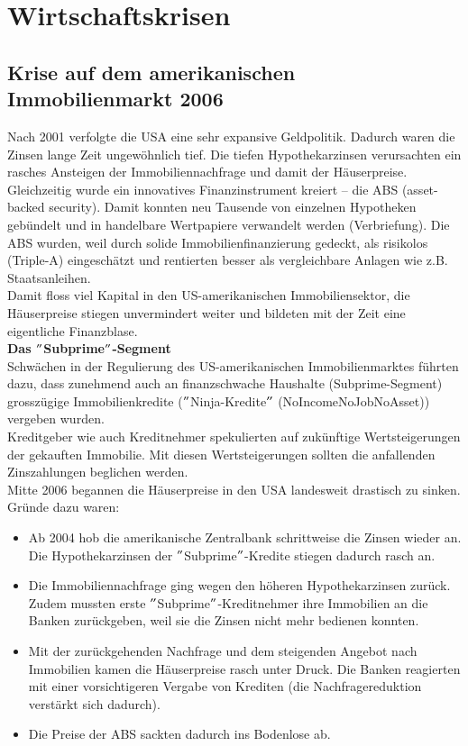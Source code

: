 \section{Wirtschaftskrisen}
\subsection{Krise auf dem amerikanischen Immobilienmarkt 2006}
Nach 2001 verfolgte die USA eine sehr expansive Geldpolitik. Dadurch waren die Zinsen lange Zeit ungewöhnlich tief. Die tiefen Hypothekarzinsen verursachten ein rasches Ansteigen der Immobiliennachfrage und damit der Häuserpreise.\\
Gleichzeitig wurde ein innovatives Finanzinstrument kreiert – die ABS (asset-backed security). Damit konnten neu Tausende von einzelnen Hypotheken gebündelt und in handelbare Wertpapiere verwandelt werden (Verbriefung). Die ABS wurden, weil durch solide Immobilienfinanzierung gedeckt, als risikolos (Triple-A) eingeschätzt und rentierten besser als vergleichbare Anlagen wie z.B. Staatsanleihen.\\
Damit floss viel Kapital in den US-amerikanischen Immobiliensektor, die Häuserpreise stiegen unvermindert weiter und bildeten mit der Zeit eine eigentliche Finanzblase.\\
\textbf{Das $"$Subprime$"$-Segment}\\
Schwächen in der Regulierung des US-amerikanischen Immobilienmarktes führten dazu, dass zunehmend auch an finanzschwache Haushalte (Subprime-Segment) grosszügige Immobilienkredite ($"$Ninja-Kredite$"$ (NoIncomeNoJobNoAsset)) vergeben wurden.\\
Kreditgeber wie auch Kreditnehmer spekulierten auf zukünftige Wertsteigerungen der gekauften Immobilie. Mit diesen Wertsteigerungen sollten die anfallenden Zinszahlungen beglichen werden.\\
Mitte 2006 begannen die Häuserpreise in den USA landesweit drastisch zu sinken. Gründe dazu waren:
\begin{itemize}
	\item Ab 2004 hob die amerikanische Zentralbank schrittweise die Zinsen wieder an. Die Hypothekarzinsen der $"$Subprime$"$-Kredite stiegen dadurch rasch an.
	\item Die Immobiliennachfrage ging wegen den höheren Hypothekarzinsen zurück. Zudem mussten erste $"$Subprime$"$-Kreditnehmer ihre Immobilien an die Banken zurückgeben, weil sie die Zinsen nicht mehr bedienen konnten.
	\item Mit der zurückgehenden Nachfrage und dem steigenden Angebot nach Immobilien kamen die Häuserpreise rasch unter Druck. Die Banken reagierten mit einer vorsichtigeren Vergabe von Krediten (die Nachfragereduktion verstärkt sich dadurch).
	\item Die Preise der ABS sackten dadurch ins Bodenlose ab.
\end{itemize}

